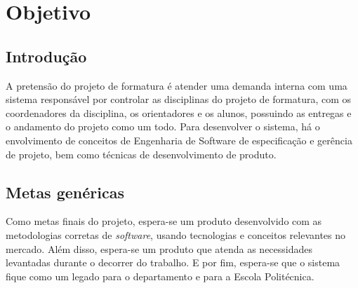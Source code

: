 \chapter{Objetivo}

\section{Introdução}

A pretensão do projeto de formatura é atender uma demanda interna com uma sistema responsável por controlar as disciplinas do projeto de formatura, com os coordenadores da disciplina, os orientadores e os alunos, possuindo as entregas e o andamento do projeto como um todo. Para desenvolver o sistema, há o envolvimento de conceitos de Engenharia de Software de especificação e gerência de projeto, bem como técnicas de desenvolvimento de produto.

\section{Metas genéricas}

Como metas finais do projeto, espera-se um produto desenvolvido com as metodologias corretas de \textit{software}, usando tecnologias e conceitos relevantes no mercado. Além disso, espera-se um produto que atenda as necessidades levantadas durante o decorrer do trabalho. E por fim, espera-se que o sistema fique como um legado para o departamento e para a Escola Politécnica.
